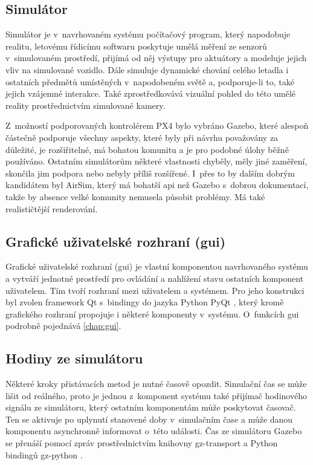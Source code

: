     \subsection{Simulátor}
      Simulátor je v~navrhovaném systému počítačový program, který napodobuje realitu, letovému řídicímu softwaru poskytuje umělá měření ze senzorů v~simulovaném prostředí, přijímá od něj výstupy pro aktuátory a modeluje jejich vliv na simulované vozidlo. Dále simuluje dynamické chování celého letadla i ostatních předmětů umístěných v~napodobeném světě a, podporuje-li to, také jejich vzájemné interakce. Také zprostředkovává vizuální pohled do této umělé reality prostřednictvím simulované kamery.

      Z~možností podporovaných kontrolérem PX4 bylo vybráno Gazebo, které alespoň částečně podporuje všechny aspekty, které byly při návrhu považovány za důležité, je rozšiřitelné, má bohatou komunitu a je pro podobné úlohy běžně používáno. Ostatním simulátorům některé vlastnosti chyběly, měly jiné zaměření, skončila jim podpora nebo nebyly příliš rozšířené. I~přes to by dalším dobrým kandidátem byl AirSim, který má bohatší \acrshort{api} než Gazebo s~dobrou dokumentací, takže by absence velké komunity nemusela působit problémy. Má také realističtější renderování.
    \subsection{Grafické uživatelské rozhraní (\acrshort{gui})}
      Grafické uživatelské rozhraní (\acrshort{gui}) je vlastní komponentou navrhovaného systému a vytváří jednotné prostředí pro ovládání a nahlížení stavu ostatních komponent uživatelem. Tím tvoří rozhraní mezi uživatelem a systémem. Pro jeho konstrukci byl zvolen framework Qt s~bindingy do jazyka Python PyQt \cite{pyqt}, který kromě grafického rozhraní propojuje i některé komponenty v~systému. O~funkcích \acrshort{gui} podrobně pojednává \cref{chap:gui}. 
    \subsection{Hodiny ze simulátoru}
      Některé kroky přistávacích metod je nutné časově opozdit. Simulační čas se může lišit od reálného, proto je jednou z~komponent systému také přijímač hodinového signálu ze simulátoru, který ostatním komponentám může poskytovat časovač. Ten se aktivuje po uplynutí stanovené doby v~simulačním čase a může danou komponentu asynchronně informovat o~této události. Čas ze simulátoru Gazebo se přenáší pomocí zpráv prostřednictvím knihovny gz-transport a Python bindingů gz-python \cite{gz-python}. 
